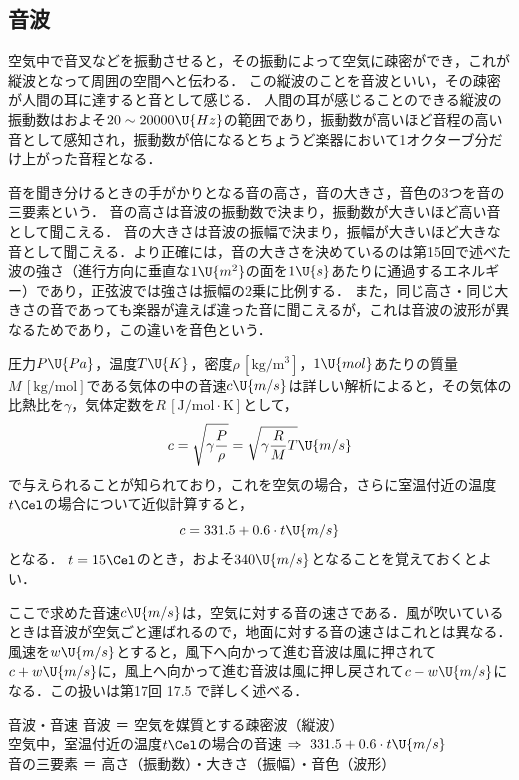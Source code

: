 \subsection{音波}

空気中で音叉などを振動させると，その振動によって空気に疎密ができ，これが縦波となって周囲の空間へと伝わる．
この縦波のことを{\gtfamily 音波}といい，その疎密が人間の耳に達すると音として感じる．
人間の耳が感じることのできる縦波の振動数はおよそ$20\sim20000\U{Hz}$の範囲であり，振動数が高いほど音程の高い音として感知され，振動数が倍になるとちょうど楽器において1オクターブ分だけ上がった音程となる．

音を聞き分けるときの手がかりとなる{\gtfamily 音の高さ}，{\gtfamily 音の大きさ}，{\gtfamily 音色}の3つを{\gtfamily 音の三要素}という．
音の高さは音波の振動数で決まり，振動数が大きいほど高い音として聞こえる．
音の大きさは音波の振幅で決まり，振幅が大きいほど大きな音として聞こえる．より正確には，音の大きさを決めているのは第15回で述べた波の強さ（進行方向に垂直な$1\U{m^2}$の面を$1\U{s}$あたりに通過するエネルギー）であり，正弦波では強さは振幅の2乗に比例する．
また，同じ高さ・同じ大きさの音であっても楽器が違えば違った音に聞こえるが，これは音波の波形が異なるためであり，この違いを音色という．

圧力$P\U{Pa}$，温度$T\U{K}$，密度$\rho\,[\mathrm{kg/m^3}]$，$1\U{mol}$あたりの質量$M\,[\mathrm{kg/mol}]$である気体の中の音速$c\U{m/s}$は詳しい解析によると，その気体の比熱比を$\gamma$，気体定数を$R\,[\mathrm{J/mol\cdot K}]$として，
\[c=\sqrt{\gamma\dfrac{P}{\rho}}=\sqrt{\gamma\dfrac{R}{M}T}\U{m/s}\]
で与えられることが知られており，これを空気の場合，さらに室温付近の温度$t\Cel$の場合について近似計算すると，
\[c=331.5+0.6\cdot t\U{m/s}\]
となる．
$t=15\Cel$のとき，およそ$340\U{m/s}$となることを覚えておくとよい．

\hspace{1zw}ここで求めた音速$c\U{m/s}$は，{\gtfamily 空気に対する}音の速さである．風が吹いているときは音波が空気ごと運ばれるので，{\gtfamily 地面に対する}音の速さはこれとは異なる．風速を$w\U{m/s}$とすると，風下へ向かって進む音波は風に押されて$c+w\U{m/s}$に，風上へ向かって進む音波は風に押し戻されて$c-w\U{m/s}$になる．この扱いは第17回 17.5 で詳しく述べる．

\begin{matome}{音波・音速}
\hspace{3mm} 音波 ＝ 空気を媒質とする疎密波（縦波）\\
\hspace{3mm} 空気中，室温付近の温度$t\Cel$の場合の音速 $\Rightarrow\ 331.5+0.6\cdot t\U{m/s}$\\
\hspace{3mm} 音の三要素 ＝ 高さ（振動数）・大きさ（振幅）・音色（波形）
\end{matome}

